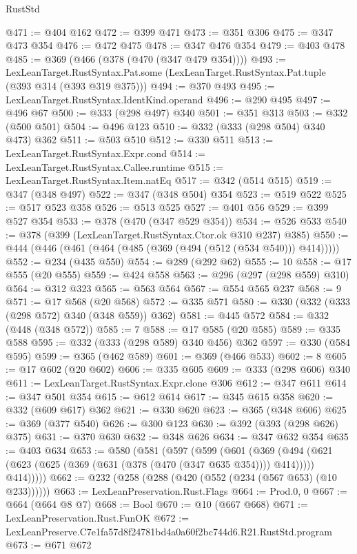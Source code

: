 \begin{lexlean}{RustStd}
\begin{coremodule}
@471 := @404 @162
@472 := @399 @471
@473 := @351 @306
@475 := @347 @473 @354
@476 := @472 @475
@478 := @347 @476 @354
@479 := @403 @478
@485 := @369 (@466 (@378 (@470 (@347 @479 @354))))
@493 := LexLeanTarget.RustSyntax.Pat.some
    (LexLeanTarget.RustSyntax.Pat.tuple (@393 @314 (@393 @319 @375)))
@494 := @370 @493
@495 := LexLeanTarget.RustSyntax.IdentKind.operand
@496 := @290 @495
@497 := @496 @67
@500 := @333 (@298 @497) @340
@501 := @351 @313
@503 := @332 (@500 @501)
@504 := @496 @123
@510 := @332 (@333 (@298 @504) @340 @473) @362
@511 := @503 @510
@512 := @330 @511
@513 := LexLeanTarget.RustSyntax.Expr.cond
@514 := LexLeanTarget.RustSyntax.Callee.runtime
@515 := LexLeanTarget.RustSyntax.Item.natEq
@517 := @342 (@514 @515)
@519 := @347 (@348 @497)
@522 := @347 (@348 @504) @354
@523 := @519 @522
@525 := @517 @523 @358
@526 := @513 @525
@527 := @401 @56
@529 := @399 @527 @354
@533 := @378 (@470 (@347 @529 @354))
@534 := @526 @533
@540 := @378 (@399 (LexLeanTarget.RustSyntax.Ctor.ok @310 @237) @385)
@550 := @444 (@446 (@461 (@464 (@485 (@369 (@494 (@512 (@534 @540))) @414)))))
@552 := @234 (@435 @550)
@554 := @289 (@292 @62)
@555 := 10
@558 := @17 @555 (@20 @555)
@559 := @424 @558
@563 := @296 (@297 (@298 @559) @310)
@564 := @312 @323
@565 := @563 @564
@567 := @554 @565 @237
@568 := 9
@571 := @17 @568 (@20 @568)
@572 := @335 @571
@580 := @330 (@332 (@333 (@298 @572) @340 (@348 @559)) @362)
@581 := @445 @572
@584 := @332 (@448 (@348 @572))
@585 := 7
@588 := @17 @585 (@20 @585)
@589 := @335 @588
@595 := @332 (@333 (@298 @589) @340 @456) @362
@597 := @330 (@584 @595)
@599 := @365 (@462 @589)
@601 := @369 (@466 @533)
@602 := 8
@605 := @17 @602 (@20 @602)
@606 := @335 @605
@609 := @333 (@298 @606) @340
@611 := LexLeanTarget.RustSyntax.Expr.clone @306
@612 := @347 @611
@614 := @347 @501 @354
@615 := @612 @614
@617 := @345 @615 @358
@620 := @332 (@609 @617) @362
@621 := @330 @620
@623 := @365 (@348 @606)
@625 := @369 (@377 @540)
@626 := @300 @123
@630 := @392 (@393 (@298 @626) @375)
@631 := @370 @630
@632 := @348 @626
@634 := @347 @632 @354
@635 := @403 @634
@653 := @580
    (@581
      (@597
        (@599
          (@601
            (@369
              (@494 (@621 (@623 (@625 (@369 (@631 (@378 (@470 (@347 @635 @354)))) @414)))))
              @414)))))
@662 := @232 (@258 (@288 (@420 (@552 (@234 (@567 @653) (@10 @233))))))
@663 := LexLeanPreservation.Rust.Flags
@664 := Prod.{0, 0}
@667 := @664 (@664 @8 @7)
@668 := Bool
@670 := @10 (@667 @668)
@671 := LexLeanPreservation.Rust.FunOK
@672 := LexLeanPreserve.C7e1fa57d8f24781bd4a0a60f2bc744d6.R21.RustStd.program
@673 := @671 @672

\end{coremodule}
\end{lexlean}
